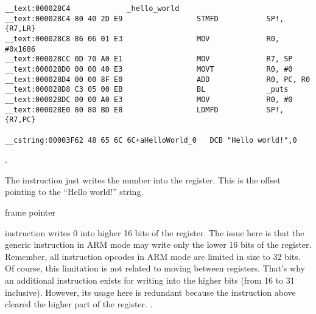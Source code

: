 \begin{lstlisting}[caption=\OptimizingXcode + \ARMMode]
__text:000028C4             _hello_world
__text:000028C4 80 40 2D E9                 STMFD           SP!, {R7,LR}
__text:000028C8 86 06 01 E3                 MOV             R0, #0x1686
__text:000028CC 0D 70 A0 E1                 MOV             R7, SP
__text:000028D0 00 00 40 E3                 MOVT            R0, #0
__text:000028D4 00 00 8F E0                 ADD             R0, PC, R0
__text:000028D8 C3 05 00 EB                 BL              _puts
__text:000028DC 00 00 A0 E3                 MOV             R0, #0
__text:000028E0 80 80 BD E8                 LDMFD           SP!, {R7,PC}

__cstring:00003F62 48 65 6C 6C+aHelloWorld_0   DCB "Hello world!",0
\end{lstlisting}

  \AndENRU {} .

{The \MOV instruction just writes the number  into the  register.
This is the offset pointing to the ``Hello world!'' string}.

\cite{IOSABI}
 frame pointer

  
{instruction writes $0$ into higher 16 bits of the register}.
{The issue here is that the generic \MOV instruction in ARM mode may write only the lower 16 bits of the register}.
{Remember, all instruction opcodes in ARM mode are limited in size to 32 bits. Of course, this limitation is not related to moving between registers.}
{That's why an additional instruction  exists for writing into the higher bits (from 16 to 31 inclusive)}.
{However, its usage here is redundant because the  instruction above cleared the higher part of the register}.
.


